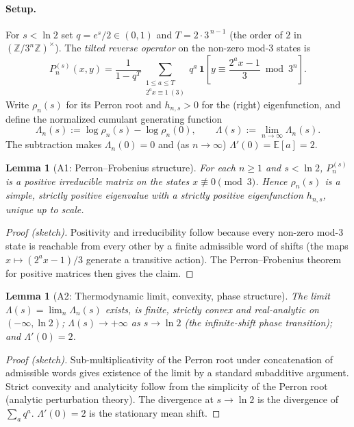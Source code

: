 \documentclass[12pt,a4paper]{article}
\newtheorem{lemma}[theorem]{Lemma}
\begin{document}
\paragraph{Setup.} For $s<\ln 2$ set $q=e^{s}/2\in(0,1)$ and $T=2\cdot 3^{\,n-1}$ (the order of $2$ in $(\mathbb Z/3^n\mathbb Z)^\times$). The \emph{tilted reverse operator} on the non-zero mod-$3$ states is
\[
P_n^{(s)}(x,y)=\frac{1}{1-q^{T}}\sum_{\substack{1\le a\le T\\ 2^{a}x\equiv1\ (3)}} q^{a}\,
\mathbf 1\!\left[y\equiv\frac{2^{a}x-1}{3}\bmod 3^{n}\right].
\]
Write $\rho_n(s)$ for its Perron root and $h_{n,s}>0$ for the (right) eigenfunction, and define the normalized cumulant generating function
\[
\Lambda_n(s):=\log\rho_n(s)-\log\rho_n(0),\qquad \Lambda(s):=\lim_{n\to\infty}\Lambda_n(s).
\]
The subtraction makes $\Lambda_n(0)=0$ and (as $n\to\infty$) $\Lambda'(0)=\mathbb E[a]=2$.

\begin{lemma}[A1: Perron--Frobenius structure]
For each $n\ge1$ and $s<\ln2$, $P_n^{(s)}$ is a positive irreducible matrix on the states $x\not\equiv0\pmod3$. Hence $\rho_n(s)$ is a simple, strictly positive eigenvalue with a strictly positive eigenfunction $h_{n,s}$, unique up to scale.
\end{lemma}
\begin{proof}[Proof (sketch)]
Positivity and irreducibility follow because every non-zero mod-$3$ state is reachable from every other by a finite admissible word of shifts (the maps $x\mapsto(2^ax-1)/3$ generate a transitive action). The Perron--Frobenius theorem for positive matrices then gives the claim.
\end{proof}

\begin{lemma}[A2: Thermodynamic limit, convexity, phase structure]
The limit $\Lambda(s)=\lim_n\Lambda_n(s)$ exists, is finite, strictly convex and real-analytic on $(-\infty,\ln2)$; $\Lambda(s)\to+\infty$ as $s\to\ln2$ (the infinite-shift phase transition); and $\Lambda'(0)=2$.
\end{lemma}
\begin{proof}[Proof (sketch)]
Sub-multiplicativity of the Perron root under concatenation of admissible words gives existence of the limit by a standard subadditive argument. Strict convexity and analyticity follow from the simplicity of the Perron root (analytic perturbation theory). The divergence at $s\to\ln2$ is the divergence of $\sum_a q^a$. $\Lambda'(0)=2$ is the stationary mean shift.
\end{proof}
\end{document}
